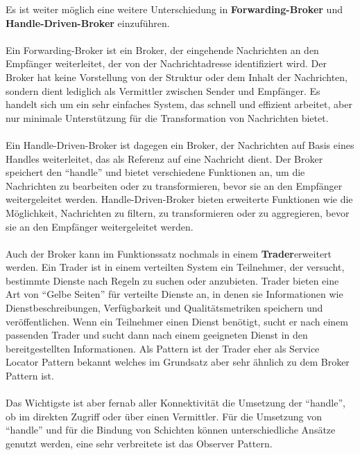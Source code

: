 Es ist weiter möglich eine weitere Unterschiedung in \textbf{Forwarding-Broker} und \textbf{Handle-Driven-Broker} einzuführen. 
\\\\
Ein Forwarding-Broker ist ein Broker, der eingehende Nachrichten an den Empfänger weiterleitet, der von der Nachrichtadresse identifiziert wird. Der Broker hat keine Vorstellung von der Struktur oder dem Inhalt der Nachrichten, sondern dient lediglich als Vermittler zwischen Sender und Empfänger. Es handelt sich um ein sehr einfaches System, das schnell und effizient arbeitet, aber nur minimale Unterstützung für die Transformation von Nachrichten bietet.
\\\\    
Ein Handle-Driven-Broker ist dagegen ein Broker, der Nachrichten auf Basis eines Handles weiterleitet, das als Referenz auf eine Nachricht dient. Der Broker speichert den \enquote{handle} und bietet verschiedene Funktionen an, um die Nachrichten zu bearbeiten oder zu transformieren, bevor sie an den Empfänger weitergeleitet werden. Handle-Driven-Broker bieten erweiterte Funktionen wie die Möglichkeit, Nachrichten zu filtern, zu transformieren oder zu aggregieren, bevor sie an den Empfänger weitergeleitet werden.
\\\\
Auch der Broker kann im Funktionssatz nochmals in einem \textbf{Trader}erweitert werden. Ein Trader ist in einem verteilten System ein Teilnehmer, der versucht, bestimmte Dienste nach Regeln zu suchen oder anzubieten. Trader bieten eine Art von \enquote{Gelbe Seiten} für verteilte Dienste an, in denen sie Informationen wie Dienstbeschreibungen, Verfügbarkeit und Qualitätsmetriken speichern und veröffentlichen. Wenn ein Teilnehmer einen Dienst benötigt, sucht er nach einem passenden Trader und sucht dann nach einem geeigneten Dienst in den bereitgestellten Informationen. Als Pattern ist der Trader eher als Service Locator Pattern bekannt welches im Grundsatz aber sehr ähnlich zu dem Broker Pattern ist. 
\\\\
Das Wichtigste ist aber fernab aller Konnektivität die Umsetzung der \enquote{handle}, ob im direkten Zugriff oder über einen Vermittler. Für die Umsetzung von \enquote{handle} und für die Bindung von Schichten können unterschiedliche Ansätze genutzt werden, eine sehr verbreitete ist das Observer Pattern. 

